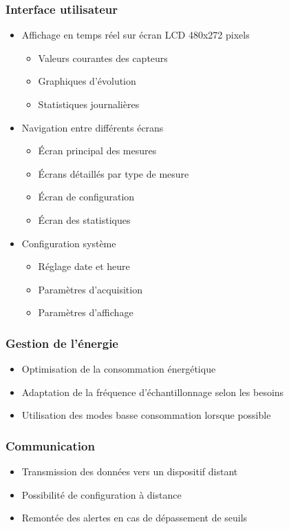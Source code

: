 \documentclass[12pt]{article}
\begin{document}
\subsubsection{Interface utilisateur}
\begin{itemize}
    \item Affichage en temps réel sur écran LCD 480x272 pixels
    \begin{itemize}
        \item Valeurs courantes des capteurs
        \item Graphiques d'évolution
        \item Statistiques journalières
    \end{itemize}
    \item Navigation entre différents écrans
    \begin{itemize}
        \item Écran principal des mesures
        \item Écrans détaillés par type de mesure
        \item Écran de configuration
        \item Écran des statistiques
    \end{itemize}
    \item Configuration système
    \begin{itemize}
        \item Réglage date et heure
        \item Paramètres d'acquisition
        \item Paramètres d'affichage
    \end{itemize}
\end{itemize}

\subsubsection{Gestion de l'énergie}
\begin{itemize}
    \item Optimisation de la consommation énergétique
    \item Adaptation de la fréquence d'échantillonnage selon les besoins
    \item Utilisation des modes basse consommation lorsque possible
\end{itemize}

\subsubsection{Communication}
\begin{itemize}
    \item Transmission des données vers un dispositif distant
    \item Possibilité de configuration à distance
    \item Remontée des alertes en cas de dépassement de seuils
\end{itemize}
\end{document}
